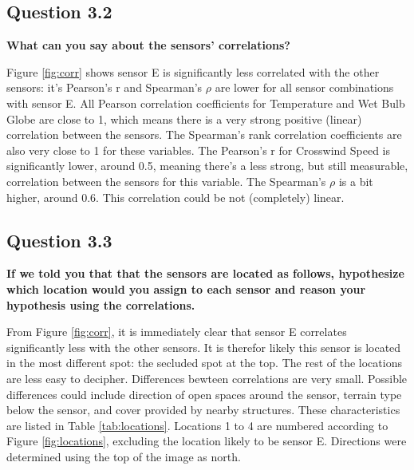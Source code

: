 \documentclass{report}
\begin{document}
	
	\subsection{Question 3.2}
	\textbf{What can you say about the sensors’ correlations?}
	
	Figure \ref{fig:corr} shows sensor E is significantly less correlated with the other sensors: it's Pearson's r and Spearman's $\rho$ are lower for all sensor combinations with sensor E. All Pearson correlation coefficients for Temperature and Wet Bulb Globe are close to 1, which means there is a very strong positive (linear) correlation between the sensors. The Spearman's rank correlation coefficients are also very close to 1 for these variables. The Pearson's r for Crosswind Speed is significantly lower, around 0.5, meaning there's a less strong, but still measurable, correlation between the sensors for this variable. The Spearman's $\rho$ is a bit higher, around 0.6. This correlation could be not (completely) linear.
	
	\subsection{Question 3.3}
	\textbf{If we told you that that the sensors are located as follows, hypothesize which location would you assign to each sensor and reason your hypothesis using the correlations.}
	
	From Figure \ref{fig:corr}, it is immediately clear that sensor E correlates significantly less with the other sensors. It is therefor likely this sensor is located in the most different spot: the secluded spot at the top. The rest of the locations are less easy to decipher. Differences bewteen correlations are very small. Possible differences could include direction of open spaces around the sensor, terrain type below the sensor, and cover provided by nearby structures. These characteristics are listed in Table \ref{tab:locations}. Locations 1 to 4 are numbered according to Figure \ref{fig:locations}, excluding the location likely to be sensor E. Directions were determined using the top of the image as north. 
	
	\FloatBarrier
	\begin{table}[htbp]
		\centering
		\caption{Possible causes of differences between sensors}
		\label{tab:locations}%
	\end{table}%
	\FloatBarrier
	
\end{document}
